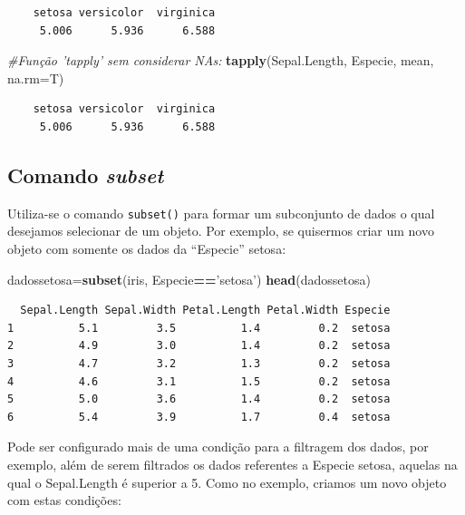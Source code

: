 \documentclass[12pt,brazil,]{book}
\newenvironment{Shaded}{\begin{snugshade}}{\end{snugshade}}
\newcommand{\CommentTok}[1]{\textcolor[rgb]{0.56,0.35,0.01}{\textit{#1}}}
\newcommand{\DataTypeTok}[1]{\textcolor[rgb]{0.13,0.29,0.53}{#1}}
\newcommand{\KeywordTok}[1]{\textcolor[rgb]{0.13,0.29,0.53}{\textbf{#1}}}
\newcommand{\NormalTok}[1]{#1}
\newcommand{\OperatorTok}[1]{\textcolor[rgb]{0.81,0.36,0.00}{\textbf{#1}}}
\newcommand{\StringTok}[1]{\textcolor[rgb]{0.31,0.60,0.02}{#1}}
\begin{document}
\begin{verbatim}
    setosa versicolor  virginica 
     5.006      5.936      6.588 
\end{verbatim}

\begin{Shaded}
\begin{Highlighting}[]
\CommentTok{#Função 'tapply' sem considerar NAs:}
\KeywordTok{tapply}\NormalTok{(Sepal.Length, Especie, mean, }\DataTypeTok{na.rm=}\NormalTok{T)}
\end{Highlighting}
\end{Shaded}

\begin{verbatim}
    setosa versicolor  virginica 
     5.006      5.936      6.588 
\end{verbatim}

\hypertarget{comando-subset}{%
\subsection{\texorpdfstring{Comando
\emph{subset}}{Comando subset}}\label{comando-subset}}

Utiliza-se o comando \texttt{subset()} para formar um subconjunto de
dados o qual desejamos selecionar de um objeto. Por exemplo, se
quisermos criar um novo objeto com somente os dados da ``Especie''
setosa:

\begin{Shaded}
\begin{Highlighting}[]
\NormalTok{dadossetosa=}\KeywordTok{subset}\NormalTok{(iris, Especie}\OperatorTok{==}\StringTok{'setosa'}\NormalTok{)}
\KeywordTok{head}\NormalTok{(dadossetosa)}
\end{Highlighting}
\end{Shaded}

\begin{verbatim}
  Sepal.Length Sepal.Width Petal.Length Petal.Width Especie
1          5.1         3.5          1.4         0.2  setosa
2          4.9         3.0          1.4         0.2  setosa
3          4.7         3.2          1.3         0.2  setosa
4          4.6         3.1          1.5         0.2  setosa
5          5.0         3.6          1.4         0.2  setosa
6          5.4         3.9          1.7         0.4  setosa
\end{verbatim}

Pode ser configurado mais de uma condição para a filtragem dos dados,
por exemplo, além de serem filtrados os dados referentes a Especie
setosa, aquelas na qual o Sepal.Length é superior a 5. Como no exemplo,
criamos um novo objeto com estas condições:
\end{document}
